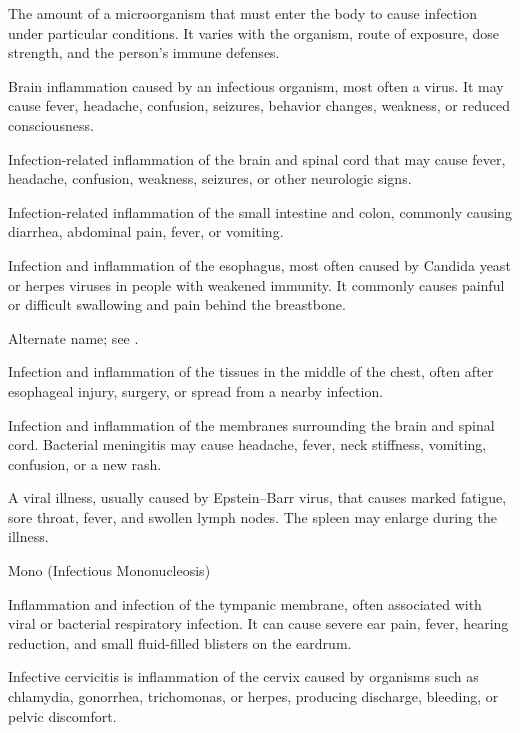  The amount of a microorganism that must enter the body to cause infection under particular conditions. It varies with the organism, route of exposure, dose strength, and the person’s immune defenses.

 Brain inflammation caused by an infectious organism, most often a virus. It may cause fever, headache, confusion, seizures, behavior changes, weakness, or reduced consciousness.

 Infection-related inflammation of the brain and spinal cord that may cause fever, headache, confusion, weakness, seizures, or other neurologic signs.

 Infection-related inflammation of the small intestine and colon, commonly causing diarrhea, abdominal pain, fever, or vomiting.

 Infection and inflammation of the esophagus, most often caused by Candida yeast or herpes viruses in people with weakened immunity. It commonly causes painful or difficult swallowing and pain behind the breastbone.

 Alternate name; see .

 Infection and inflammation of the tissues in the middle of the chest, often after esophageal injury, surgery, or spread from a nearby infection.

 Infection and inflammation of the membranes surrounding the brain and spinal cord. Bacterial meningitis may cause headache, fever, neck stiffness, vomiting, confusion, or a new rash.

 A viral illness, usually caused by Epstein–Barr virus, that causes marked fatigue, sore throat, fever, and swollen lymph nodes. The spleen may enlarge during the illness.

\synonyms
Mono (Infectious Mononucleosis)

 Inflammation and infection of the tympanic membrane, often associated with viral or
bacterial respiratory infection. It can cause severe ear pain, fever, hearing reduction,
and small fluid-filled blisters on the eardrum.

 Infective cervicitis is inflammation of the cervix caused by organisms such as chlamydia, gonorrhea, trichomonas, or herpes, producing discharge, bleeding, or pelvic discomfort.

